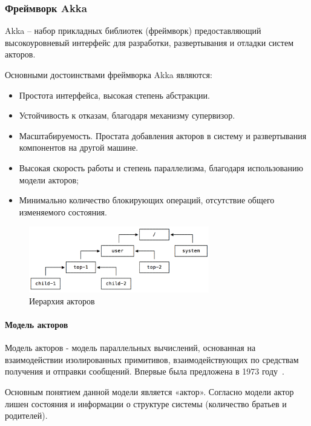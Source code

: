 \subsubsection{Фреймворк Akka}
\label{sec:techs:akka}

Akka – набор прикладных библиотек (фреймворк) предоставляющий высокоуровневый интерфейс для разработки, развертывания и отладки систем акторов.

Основными достоинствами фреймворка Akka являются:
\begin{itemize}
  \item Простота интерфейса, высокая степень абстракции.
  \item Устойчивость к отказам, благодаря механизму супервизор.
  \item Масштабируемость. Простата добавления акторов в систему и развертывания компонентов на другой машине.
  \item Высокая скорость работы и степень параллелизма, благодаря использованию модели акторов;
  \item Минимально количество блокирующих операций, отсутствие общего изменяемого состояния.
\end{itemize}

\begin{figure}[ht]
    \centering
    \includegraphics[width=0.7\textwidth]{figures/actors_hier.png}
    \caption{Иерархия акторов}
    \label{fig:techs:akka:actor_hierar}
\end{figure}

\paragraph{Модель акторов}
\label{sec:techs:akka:actor_model}
Модель акторов - модель параллельных вычислений, основанная на взаимодействии изолированных примитивов, взаимодействующих по средствам получения и отправки сообщений. Впервые была предложена в 1973 году~\cite{hewitt_bishop_steiger_actor_model}.

Основным понятием данной модели является «актор». Согласно модели актор лишен состояния и информации о структуре системы (количество братьев и родителей).

